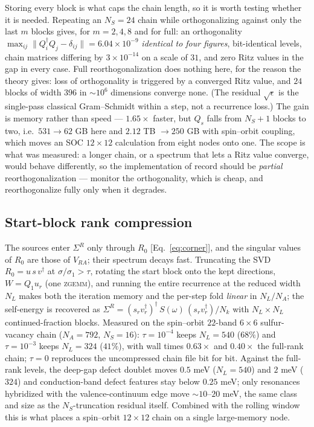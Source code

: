 \documentclass[aps,prx,reprint,superscriptaddress,nofootinbib,longbibliography]{revtex4-2}
\begin{document}
Storing every block is what caps the chain length, so it is worth testing
whether it is needed. Repeating an $N_S=24$ chain while orthogonalizing against
only the last $m$ blocks gives, for $m = 2, 4, 8$ and for full: an orthogonality
$\max_{ij}\lVert Q_i^\dagger Q_j-\delta_{ij}\rVert = 6.04\times10^{-9}$
\emph{identical to four figures}, bit-identical levels, chain matrices differing
by $3\times10^{-14}$ on a scale of $31$, and zero Ritz values in the gap in every
case. Full reorthogonalization does nothing here, for the reason the theory
gives: loss of orthogonality is triggered by a converged Ritz value, and $24$
blocks of width $396$ in $\sim10^6$ dimensions converge none. (The residual
$\sqrt\epsilon$ is the single-pass classical Gram--Schmidt within a step, not a
recurrence loss.) The gain is memory rather than speed --- $1.65\times$ faster,
but $Q_s$ falls from $N_S+1$ blocks to two, i.e.\ $531 \to 62$ GB here and
$2.12$ TB $\to 250$ GB with spin--orbit coupling, which moves an SOC
$12\times12$ calculation from eight nodes onto one. The scope is what was
measured: a longer chain, or a spectrum that lets a Ritz value converge, would
behave differently, so the implementation of record should be \emph{partial}
reorthogonalization --- monitor the orthogonality, which is cheap, and
reorthogonalize fully only when it degrades.

\subsection{Start-block rank compression}
\label{sec:rankcomp}

The sources enter $\Sigma^R$ only through $R_0$ [Eq.~\eqref{eq:corner}], and
the singular values of $R_0$ are those of $V_{RA}$; their spectrum decays
fast. Truncating the SVD $R_0 = u\,s\,v^{\dagger}$ at $\sigma/\sigma_1 >
\tau$, rotating the start block onto the kept directions, $W = Q_1 u_r$
(one \textsc{zgemm}), and running the entire recurrence at the reduced width
$N_L$ makes both the iteration memory and the per-step fold \emph{linear} in
$N_L/N_A$; the self-energy is recovered as $\Sigma^R = (s_r
v_r^{\dagger})^{\dagger}\, S(\omega)\, (s_r v_r^{\dagger})/N_k$ with
$N_L\times N_L$ continued-fraction blocks. Measured on the spin--orbit
$22$-band $6\times6$ sulfur-vacancy chain ($N_A=792$, $N_S=16$): $\tau =
10^{-4}$ keeps $N_L=540$ ($68\%$) and $\tau=10^{-3}$ keeps $N_L=324$
($41\%$), with wall times $0.63\times$ and $0.40\times$ the full-rank chain;
$\tau=0$ reproduces the uncompressed chain file bit for bit. Against the
full-rank levels, the deep-gap defect doublet moves $0.5$ meV ($N_L=540$)
and $2$ meV ($324$) and conduction-band defect features stay below
$0.25$ meV; only resonances hybridized with the valence-continuum edge move
$\sim10$--$20$ meV, the same class and size as the $N_S$-truncation residual
itself. Combined with the rolling window this is what places a spin--orbit
$12\times12$ chain on a single large-memory node.
\end{document}
